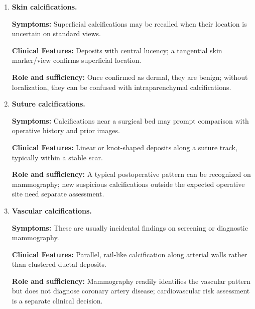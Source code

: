 \begin{enumerate}[leftmargin=*,itemsep=0.45em,topsep=0.4em]
\item \textbf{Skin calcifications.}\par\noindent\textbf{Symptoms:} Superficial calcifications may be recalled when their location is uncertain on standard views.\par\noindent\textbf{Clinical Features:} Deposits with central lucency; a tangential skin marker/view confirms superficial location.\par\noindent\textbf{Role and sufficiency:} Once confirmed as dermal, they are benign; without localization, they can be confused with intraparenchymal calcifications.
\item \textbf{Suture calcifications.}\par\noindent\textbf{Symptoms:} Calcifications near a surgical bed may prompt comparison with operative history and prior images.\par\noindent\textbf{Clinical Features:} Linear or knot-shaped deposits along a suture track, typically within a stable scar.\par\noindent\textbf{Role and sufficiency:} A typical postoperative pattern can be recognized on mammography; new suspicious calcifications outside the expected operative site need separate assessment.
\item \textbf{Vascular calcifications.}\par\noindent\textbf{Symptoms:} These are usually incidental findings on screening or diagnostic mammography.\par\noindent\textbf{Clinical Features:} Parallel, rail-like calcification along arterial walls rather than clustered ductal deposits.\par\noindent\textbf{Role and sufficiency:} Mammography readily identifies the vascular pattern but does not diagnose coronary artery disease; cardiovascular risk assessment is a separate clinical decision.
\end{enumerate}

